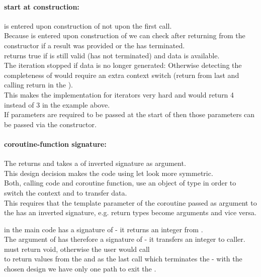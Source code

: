 \paragraph*{start at construction:}
\corofunction is entered upon construction of \coro not upon the first call.\\
\newline
Because \corofunction is entered upon construction of \coro we can check after
returning from the constructor if a result was provided or the \corofunction
has terminated.\\
\corobool returns true if \coro is still valid (\corofunction has not terminated)
and data is available.\\
The iteration stopped if data is no longer generated:
Otherwise detecting the completeness of \coro would require an extra context
switch (return from last \coroop and calling return in the \corofunction).\\
This makes the implementation for iterators very hard and 
would return 4 instead of 3 in the example above.\\
\newline
If parameters are required to be passed at the start of \corofunction then those
parameters can be passed via the \coro constructor.

\paragraph*{coroutine-function signature:}
The \corofunction returns  and takes a \coro of inverted signature
as argument.\\
\newline
This design decision makes the code using \coro let look more symmetric.\\
Both, calling code and coroutine function, use an object of type \coro in order
to switch the context and to transfer data.\\
This requires that the template parameter of the coroutine passed as argument
to the \corofunction has an inverted signature, e.g. return types become
arguments and vice versa.

\coro in the main code has a signature of  - it returns an
integer from \corofunction.\\
The \coro argument of \corofunction {} has therefore a signature of
 - it transfers an integer to caller.\\
\newline
\corofunction must return void, otherwise the user would call\\
\coroop to return values from the \corofunction and  as the
last call which terminates the \corofunction - with the chosen design we have
only one path to exit the \corofunction.

